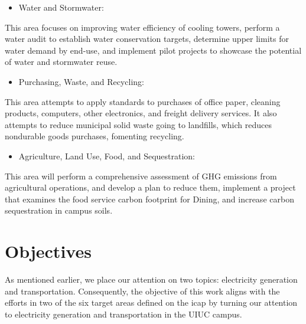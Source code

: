 \documentclass[11pt,letterpaper]{article}
\begin{document}
\begin{itemize}
	\item Water and Stormwater:
\end{itemize}
This area focuses on improving water efficiency of cooling towers, perform a water audit to establish water conservation targets, determine upper limits for water demand by end-use, and implement pilot projects to showcase the potential of water and stormwater reuse.

\begin{itemize}
	\item Purchasing, Waste, and Recycling:
\end{itemize}
This area attempts to apply standards to purchases of office paper, cleaning products, computers, other electronics, and freight delivery services. It also attempts to reduce municipal solid waste going to landfills, which reduces nondurable goods purchases, fomenting recycling.

\begin{itemize}
	\item Agriculture, Land Use, Food, and Sequestration:
\end{itemize}
This area will perform a comprehensive assessment of \gls{GHG} emissions from agricultural operations, and develop a plan to reduce them, implement a project that examines the food service carbon footprint for Dining, and increase carbon sequestration in campus soils.


\section{Objectives}

As mentioned earlier, we place our attention on two topics: electricity generation and transportation.
Consequently, the objective of this work aligns with the efforts in two of the six target areas defined on the \gls{icap} by turning our attention to electricity generation and transportation in the \gls{UIUC} campus.
\end{document}
